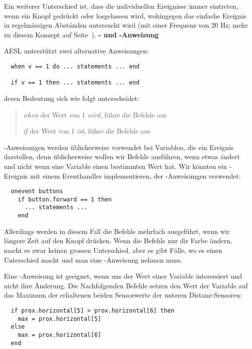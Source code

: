 Ein weiterer Unterschied ist, dass die individuellen Ereignisse immer eintreten, wenn ein Knopf gedrückt oder losgelassen wird, wohingegen das einfache Ereignis  in regelmässigen Abständen untersucht wird (mit einer Frequenz von 20 Hz; mehr zu diesem Konzept auf Seite~\pageref{pg.hz}).
\newpage
\textbf{\large {}- und -Anweisung\label{p.if-when}}

AESL unterstützt zwei alternative Anweisungen:
\begin{footnotesize}
\begin{verbatim}
  when v == 1 do ... statements ... end

  if v == 1 then ... statements ... end
\end{verbatim}
\end{footnotesize}
deren Bedeutung sich wie folgt unterscheidet: 
\begin{quote}
\emph{when} der Wert von  1 \emph{wird}, führe die Befehle aus

\emph{if} der Wert von  1 \emph{ist}, führe die Befehle aus
\end{quote}

-Anweisungen werden üblicherweise verwendet bei Variablen, die ein Ereignis darstellen, denn üblicherweise wollen wir Befehle ausführen, wenn etwas ändert und nicht wenn eine Variable einen bestimmten Wert hat. Wir könnten ein -Ereignis mit einem Eventhandler implementieren, der -Anweisungen verwendet:

\begin{footnotesize}
\begin{verbatim}
  onevent buttons
    if button.forward == 1 then
      ... statements ...
    end
\end{verbatim}
\end{footnotesize}
Allerdings werden in diesem Fall die Befehle mehrfach ausgeführt, wenn wir längere Zeit auf den Knopf drücken. Wenn die Befehle nur dir Farbe ändern, macht es zwar keinen grossen Unterschied, aber es gibt Fälle, wo es einen Unterschied macht und man eine -Anweisung nehmen muss.

Eine -Anweisung ist geeignet, wenn uns der Wert einer Variable interessiert und nicht ihre Änderung. Die Nachfolgenden Befehle setzen den Wert der Variable  auf das Maximum der erhaltenen beiden Sensorwerte der unteren Distanz-Sensoren: 

\begin{footnotesize}
\begin{verbatim}
  if prox.horizontal[5] > prox.horizontal[6] then
    max = prox.horizontal[5]
  else
    max = prox.horizontal[6]
  end
\end{verbatim}
\end{footnotesize}

